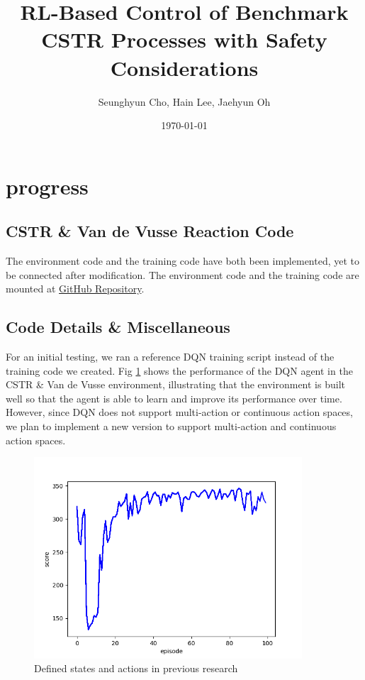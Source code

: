 \documentclass[11pt]{article}
\begin{document}
\title{RL-Based Control of Benchmark CSTR Processes with Safety Considerations}
\author{Seunghyun Cho, Hain Lee, Jaehyun Oh}
\date{\today}


\setlength{\droptitle}{-4cm}  %
\maketitle

\section{progress}
\subsection{CSTR \& Van de Vusse Reaction Code}


The environment code and the training code have both been implemented, yet to be connected after modification.
The environment code and the training code are mounted at \href{https://github.com/OhtoEncoder/SNU2025RL_Team16}{GitHub Repository}.

\subsection{Code Details \& Miscellaneous}

For an initial testing, we ran a reference DQN training script instead of the training code we created.
Fig \ref{fig1} shows the performance of the DQN agent in the CSTR \& Van de Vusse environment, 
illustrating that the environment is built well so that the agent is able to learn and improve its performance over time.
However, since DQN does not support multi-action or continuous action spaces,
we plan to implement a new version to support multi-action and continuous action spaces.

\begin{figure}[H]
    \centering
    \includegraphics[width=10cm]{DQN_graph.png} %
    \caption{Defined states and actions in previous research}
    \label{fig1}
\end{figure}
\end{document}

